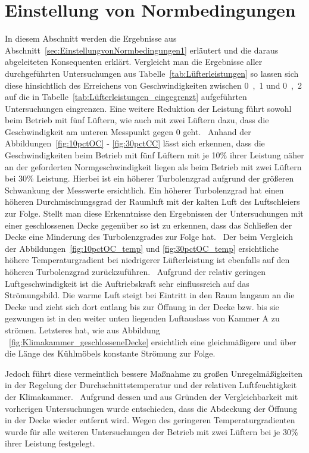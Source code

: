 \section{Einstellung von Normbedingungen}
\label{sec:Einstellung von Normbedingungen}

In diesem Abschnitt werden die Ergebnisse aus Abschnitt~\ref{sec:EinstellungvonNormbedingungen1} erläutert und die daraus abgeleiteten Konsequenten erklärt.
Vergleicht man die Ergebnisse aller durchgeführten Untersuchungen aus Tabelle~\ref{tab:Lüfterleistungen} so lassen sich diese hinsichtlich des Erreichens von Geschwindigkeiten zwischen \unit{0,1}{\meter\per\second} und \unit{0,2}{\meter\per\second} auf die in Tabelle~\ref{tab:Lüfterleistungen_eingegrenzt} aufgeführten Untersuchungen eingrenzen. Eine weitere Reduktion der Leistung führt sowohl beim Betrieb mit fünf Lüftern, wie auch mit zwei Lüftern dazu, dass die Geschwindigkeit am unteren Messpunkt gegen 0 geht. \
Anhand der Abbildungen~\ref{fig:10pctOC} - \ref{fig:30pctCC} lässt sich erkennen, dass die Geschwindigkeiten beim Betrieb mit fünf Lüftern mit je \unit{10}{\%} ihrer Leistung näher an der geforderten Normgeschwindigkeit liegen als beim Betrieb mit zwei Lüftern bei \unit{30}{\%} Leistung. Hierbei ist ein höherer Turbolenzgrad aufgrund der größeren Schwankung der Messwerte ersichtlich. Ein höherer Turbolenzgrad hat einen höheren Durchmischungsgrad der Raumluft mit der kalten Luft des Luftschleiers zur Folge. 
Stellt man diese Erkenntnisse den Ergebnissen der Untersuchungen mit einer geschlossenen Decke gegenüber so ist zu erkennen, dass das Schließen der Decke eine Minderung des Turbolenzgrades zur Folge hat. \
Der beim Vergleich der Abbildungen~\ref{fig:10pctOC_temp} und \ref{fig:30pctOC_temp} ersichtliche höhere Temperaturgradient bei niedrigerer Lüfterleistung ist ebenfalls auf den höheren Turbolenzgrad zurückzuführen. \
Aufgrund der relativ geringen Luftgeschwindigkeit ist die Auftriebskraft sehr einflussreich auf das Strömungsbild. Die warme Luft steigt bei Eintritt in den Raum langsam an die Decke und zieht sich dort entlang bis zur Öffnung in der Decke bzw. bis sie gezwungen ist in den weiter unten liegenden Luftauslass von Kammer A zu strömen.
Letzteres hat, wie aus Abbildung ~\ref{fig:Klimakammer_geschlosseneDecke} ersichtlich eine gleichmäßigere und über die Länge des Kühlmöbels konstante Strömung zur Folge.\

Jedoch führt diese vermeintlich bessere Maßnahme zu großen Unregelmäßigkeiten in der Regelung der Durchschnittstemperatur und der relativen Luftfeuchtigkeit der Klimakammer. \
Aufgrund dessen und aus Gründen der Vergleichbarkeit mit vorherigen Untersuchungen wurde entschieden, dass die Abdeckung der Öffnung in der Decke wieder entfernt wird. Wegen des geringeren Temperaturgradienten wurde für alle weiteren Untersuchungen der Betrieb mit zwei Lüftern bei je \unit{30}{\%} ihrer Leistung festgelegt.


